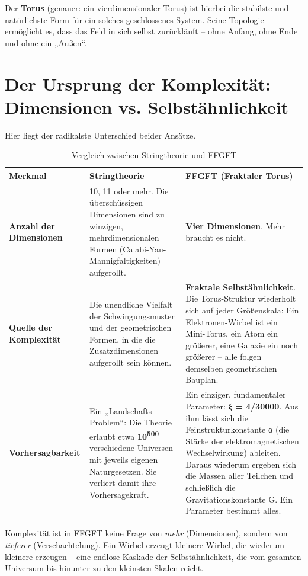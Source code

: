 	Der \textbf{Torus} (genauer: ein vierdimensionaler Torus) ist hierbei die stabilste und natürlichste Form für ein solches geschlossenes System. Seine Topologie ermöglicht es, dass das Feld in sich selbst zurückläuft – ohne Anfang, ohne Ende und ohne ein „Außen“.
	
	\section{Der Ursprung der Komplexität: Dimensionen vs. Selbstähnlichkeit}
	
	Hier liegt der radikalste Unterschied beider Ansätze.
	
	\begin{table}[h]
		\centering
		\begin{tabular}{p{4cm} p{5cm} p{5cm}}
			\toprule
			\textbf{Merkmal} & \textbf{Stringtheorie} & \textbf{FFGFT (Fraktaler Torus)} \\
			\midrule
			\textbf{Anzahl der Dimensionen} & 10, 11 oder mehr. Die überschüssigen Dimensionen sind zu winzigen, mehrdimensionalen Formen (Calabi-Yau-Mannigfaltigkeiten) aufgerollt. & \textbf{Vier Dimensionen}. Mehr braucht es nicht. \\
			\addlinespace
			\textbf{Quelle der Komplexität} & Die unendliche Vielfalt der Schwingungsmuster und der geometrischen Formen, in die die Zusatzdimensionen aufgerollt sein können. & \textbf{Fraktale Selbstähnlichkeit}. Die Torus-Struktur wiederholt sich auf jeder Größenskala: Ein Elektronen-Wirbel ist ein Mini-Torus, ein Atom ein größerer, eine Galaxie ein noch größerer – alle folgen demselben geometrischen Bauplan. \\
			\addlinespace
			\textbf{Vorhersagbarkeit} & Ein „Landschafts-Problem“: Die Theorie erlaubt etwa \textbf{10\textsuperscript{500}} verschiedene Universen mit jeweils eigenen Naturgesetzen. Sie verliert damit ihre Vorhersagekraft. & Ein einziger, fundamentaler Parameter: \textbf{ξ = 4/30000}. Aus ihm lässt sich die Feinstrukturkonstante α (die Stärke der elektromagnetischen Wechselwirkung) ableiten. Daraus wiederum ergeben sich die Massen aller Teilchen und schließlich die Gravitationskonstante G. Ein Parameter bestimmt alles. \\
			\bottomrule
		\end{tabular}
		\caption{Vergleich zwischen Stringtheorie und FFGFT}
		\label{tab:vergleich}
	\end{table}
	
	Komplexität ist in FFGFT keine Frage von \textit{mehr} (Dimensionen), sondern von \textit{tieferer} (Verschachtelung). Ein Wirbel erzeugt kleinere Wirbel, die wiederum kleinere erzeugen – eine endlose Kaskade der Selbstähnlichkeit, die vom gesamten Universum bis hinunter zu den kleinsten Skalen reicht.
	
